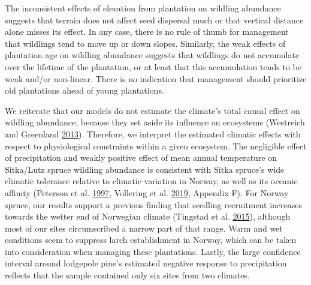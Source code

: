 \documentclass[
]{article}
\begin{document}
The inconsistent effects of elevation from plantation on wildling abundance suggests that terrain does not affect seed dispersal much or that vertical distance alone misses its effect.
In any case, there is no rule of thumb for management that wildlings tend to move up or down slopes.
Similarly, the weak effects of plantation age on wildling abundance suggests that wildlings do not accumulate over the lifetime of the plantation, or at least that this accumulation tends to be weak and/or non-linear.
There is no indication that management should prioritize old plantations ahead of young plantations.

We reiterate that our models do not estimate the climate's total causal effect on wildling abundance, because they set aside its influence on ecosystems (Westreich and Greenland \protect\hyperlink{ref-westreichTableFallacyPresenting2013}{2013}).
Therefore, we interpret the estimated climatic effects with respect to physiological constraints within a given ecosystem.
The negligible effect of precipitation and weakly positive effect of mean annual temperature on Sitka/Lutz spruce wildling abundance is consistent with Sitka spruce's wide climatic tolerance relative to climatic variation in Norway, as well as its oceanic affinity (Peterson et al. \protect\hyperlink{ref-petersonEcologyManagementSitka1997}{1997}, Vollering et al. \protect\hyperlink{ref-volleringBunchingBackgroundBetters2019}{2019}, Appendix F).
For Norway spruce, our results support a previous finding that seedling recruitment increases towards the wetter end of Norwegian climate (Tingstad et al. \protect\hyperlink{ref-tingstadTemperaturePrecipitationBiotic2015}{2015}), although most of our sites circumscribed a narrow part of that range.
Warm and wet conditions seem to suppress larch establishment in Norway, which can be taken into consideration when managing these plantations.
Lastly, the large confidence interval around lodgepole pine's estimated negative response to precipitation reflects that the sample contained only six sites from two climates.
\end{document}
